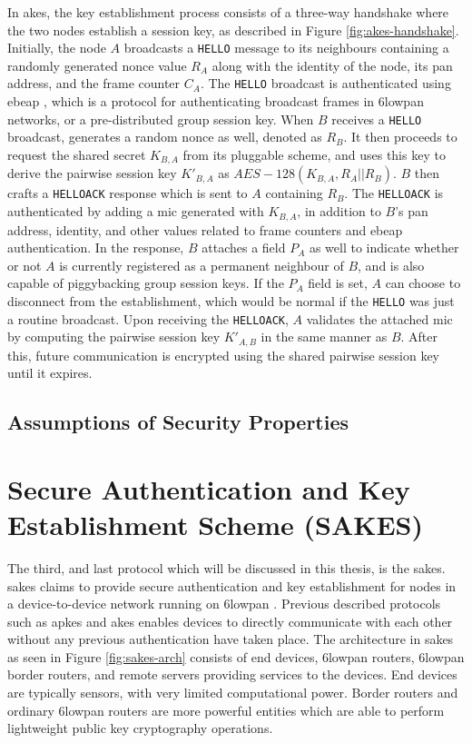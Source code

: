 In \gls{akes}, the key establishment process consists of a three-way handshake where the two nodes establish a session key, as described in Figure \ref{fig:akes-handshake}. Initially, the node $A$ broadcasts a \texttt{HELLO} message to its neighbours containing a randomly generated nonce value $R_A$ along with the identity of the node, its \gls{pan} address, and the frame counter $C_A$. The \texttt{HELLO} broadcast is authenticated using \gls{ebeap} \cite{krentz20136lowpan}, which is a protocol for authenticating broadcast frames in \gls{6lowpan} networks, or a pre-distributed group session key. When $B$ receives a \texttt{HELLO} broadcast, generates a random nonce as well, denoted as $R_B$. It then proceeds to request the shared secret $K_{B,A}$ from its pluggable scheme, and uses this key to derive the pairwise session key $K'_{B,A}$ as $AES-128(K_{B,A}, R_A || R_B)$. $B$ then crafts a \texttt{HELLOACK} response which is sent to $A$ containing $R_B$. The \texttt{HELLOACK} is authenticated by adding a \gls{mic} generated with $K_{B,A}$, in addition to $B$'s \gls{pan} address, identity, and other values related to frame counters and \gls{ebeap} authentication. In the response, $B$ attaches a field $P_A$ as well to indicate whether or not $A$ is currently registered as a permanent neighbour of $B$, and is also capable of piggybacking group session keys. If the $P_A$ field is set, $A$ can choose to disconnect from the establishment, which would be normal if the \texttt{HELLO} was just a routine broadcast. Upon receiving the \texttt{HELLOACK}, $A$ validates the attached \gls{mic} by computing the pairwise session key $K'_{A, B}$ in the same manner as $B$. After this, future communication  is encrypted using the shared pairwise session key until it expires.


\subsection{Assumptions of Security Properties}






\section{Secure Authentication and Key Establishment Scheme (SAKES)}

The third, and last protocol which will be discussed in this thesis, is the \gls{sakes}. \gls{sakes} claims to provide secure authentication and key establishment for nodes in a device-to-device network running on \gls{6lowpan} \cite{hussen2013sakes}. Previous described protocols such as \gls{apkes} and \gls{akes} enables devices to directly communicate with each other without any previous authentication have taken place. The architecture in \gls{sakes} as seen in Figure \ref{fig:sakes-arch} consists of end devices, \gls{6lowpan} routers, \gls{6lowpan} border routers, and remote servers providing services to the devices. End devices are typically sensors, with very limited computational power. Border routers and ordinary \gls{6lowpan} routers are more powerful entities which are able to perform lightweight public key cryptography operations.



